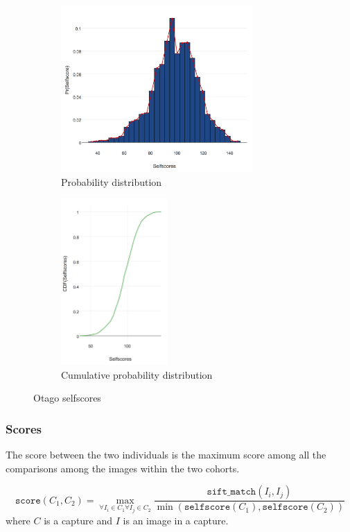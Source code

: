 \begin{figure}[htb]
    \begin{subfigure}[t]{0.6\textwidth}
        \centering
        \includegraphics[height=2.5in]{dataset/otago/selfscores}
        \caption{Probability distribution}
    \end{subfigure}%
    \begin{subfigure}[t]{0.35\textwidth}
        \centering
        \includegraphics[height=2.5in]{dataset/otago/cdf_selfscores}
        \caption{Cumulative probability distribution}
    \end{subfigure}
    \caption{Otago selfscores}
\end{figure}

\subsubsection{Scores}

The score between the two individuals is the maximum score among all the
comparisons among the images within the two cohorts.

$$\texttt{score}(C_1, C_2) = \max_{\forall I_i \in C_1 \forall I_j \in C_2}
    \frac{\texttt{sift\_match}(I_i, I_j)}{\min(\texttt{selfscore}(C_1),
        \texttt{selfscore}(C_2))}$$
where $C$ is a capture and $I$ is an image in a capture.

